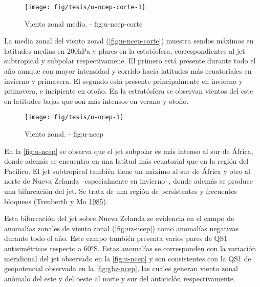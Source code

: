 \documentclass[spanish,a4paper]{book}
\begin{document}
\begin{figure}

{\centering \texttt{[image: fig/tesis/u-ncep-corte-1]} 

}

\caption{Viento zonal medio. - fig:u-ncep-corte}\label{fig:u-ncep-corte}
\end{figure}

La media zonal del viento zonal (\autoref{fig:u-ncep-corte}) muestra
sendos máximos en latitudes medias en 200hPa y plares en la estatósfera,
correspondientes al jet subtropical y subpolar respectivamene. El
primero está presente durante todo el año aunque con mayor intensidad y
corrido hacia latitudes más ecuatoriales en invierno y primavera. El
segundo está presente principalmente en invierno y primavera, e
incipiente en otoño. En la estratósfera se observan vientos del este en
latitudes bajas que son más intensos en verano y otoño.

\begin{landscape}\begin{figure}

{\centering \texttt{[image: fig/tesis/u-ncep-1]} 

}

\caption{Viento zonal. - fig:u-ncep}\label{fig:u-ncep}
\end{figure}
\end{landscape}

En la \autoref{fig:u-ncep} se observa que el jet subpolar es más intenso
al sur de África, donde además se encuentra en una latitud más
ecuatorial que en la región del Pacífico. El jet subtropical también
tiene un máximo al sur de África y otro al norte de Nueva Zelanda
--especialmente en invierno--, donde además se produce una bifurcación
del jet. Se trata de una región de persistentes y frecuentes bloqueos
(Trenberth y Mo \protect\hyperlink{ref-Trenberth1985}{1985}).

Esta bifurcación del jet sobre Nueva Zelanda se evidencia en el campo de
anomalías zonales de viento zonal (\autoref{fig:uz-ncep}) como anomalías
negativas durante todo el año. Este campo también presenta varios pares
de QS1 antisimétricos respecto a 60°S. Estas anomalías se corresponden
con la variación meridional del jet observado en la \autoref{fig:u-ncep}
y son consistentes con la QS1 de geopotencial observada en la
\autoref{fig:ghz-ncep}, las cuales generan viento zonal anómalo del este
y del oeste al norte y sur del anticiclón respectivamente.
\end{document}
